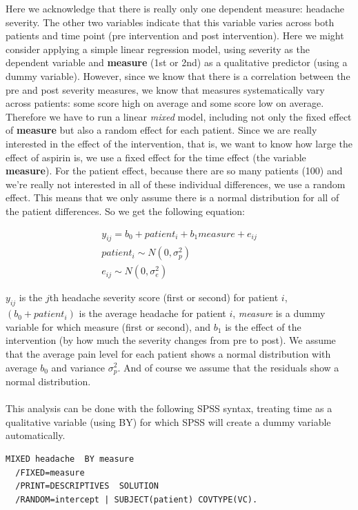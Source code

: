 \documentclass[]{report}\usepackage[]{graphicx}\usepackage[]{color}
\begin{document}
Here we acknowledge that there is really only one dependent measure: headache severity. The other two variables indicate that this variable varies across both patients and time point (pre intervention and post intervention). Here we might consider applying a simple linear regression model, using severity as the dependent variable and \textbf{measure} (1st or 2nd) as a qualitative predictor (using a dummy variable). However, since we know that there is a correlation between the pre and post severity measures, we know that measures systematically vary across patients: some score high on average and some score low on average. Therefore we have to run a linear \textit{mixed} model, including not only the fixed effect of \textbf{measure} but also a random effect for each patient. Since we are really interested in the effect of the intervention, that is, we want to know how large the effect of aspirin is, we use a fixed effect for the time effect (the variable \textbf{measure}). For the patient effect, because there are so many patients (100) and we're really not interested in all of these individual differences, we use a random effect. This means that we only assume there is a normal distribution for all of the patient differences. So we get the following equation:


\begin{eqnarray}
y_{ij} = b_0 + patient_i + b_1 measure + e_{ij} \\
patient_i \sim N(0, \sigma_p^2)\\
e_{ij} \sim N(0, \sigma_e^2)
\end{eqnarray}

$y_{ij}$ is the $j$th headache severity score (first or second) for patient $i$, $(b_0 + patient_i)$ is the average headache for patient $i$, \textit{measure} is a dummy variable for which measure (first or second), and $b_1$ is the effect of the intervention (by how much the severity changes from pre to post). We assume that the average pain level for each patient shows a normal distribution with average $b_0$ and variance $\sigma^2_p$. And of course we assume that the residuals show a normal distribution.
\\
\\
This analysis can be done with the following SPSS syntax, treating time as a qualitative variable (using BY) for which SPSS will create a dummy variable automatically. 


\begin{verbatim}
MIXED headache  BY measure
  /FIXED=measure
  /PRINT=DESCRIPTIVES  SOLUTION
  /RANDOM=intercept | SUBJECT(patient) COVTYPE(VC).
\end{verbatim}
\end{document}
